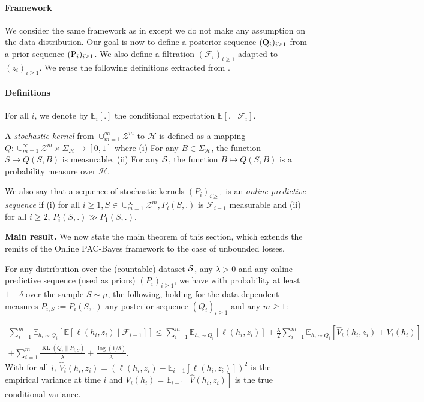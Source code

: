\paragraph{Framework} We consider the same framework as in  except we do not make any assumption on the data distribution. Our goal is now to define a posterior sequence $(\Q_i)_{i\geq 1}$ from a prior sequence $(\P_i)_{i\geq 1}$. We also define a filtration $(\mathcal{F}_{i})_{i\geq 1}$ adapted to $(z_i)_{i\geq 1}$. We reuse the following definitions extracted from \cite{haddouche2022online}.

\paragraph{Definitions} For all $i$, we denote by $\mathbb{E}_{i}[.]$ the conditional expectation $\mathbb{E}[.\mid \mathcal{F}_i]$.

A \emph{stochastic kernel} from $\cup_{m=1}^\infty\mathcal{Z}^m$ to $\mathcal{H}$ is defined as a mapping $Q: \cup_{m=1}^\infty\mathcal{Z}^m\times \Sigma_{\mathcal{H}} \rightarrow [0,1]$ where
(i) For any $B\in \Sigma_{\mathcal{H}}$, the function  $S\mapsto Q(S,B)$ is measurable,  (ii) For any $\S$, the function $B\mapsto Q(S,B)$ is a probability measure over $\mathcal{H}$.


We also say that a sequence of stochastic kernels $(P_i)_{i\geq 1}$ is an \emph{online predictive sequence} if (i) for all $i\geq 1, S\in\cup_{m=1}^\infty\mathcal{Z}^m, P_i(S,.)$ is $\mathcal{F}_{i-1}$ measurable and (ii) for all $i \geq 2$, $P_i(S,.)\gg P_{1}(S,.)$.

\textbf{Main result.} We now state the main theorem of this section, which extends the remits of the Online PAC-Bayes framework to the case of unbounded losses.

\begin{theorem}
  \label{th: main_thm_onl}
  For any distribution over the (countable) dataset $\S$, any $\lambda>0$ and any online predictive sequence (used as priors) $(P_i)_{i\geq 1}$, we have with probability at least $1-\delta$ over the sample $S\sim\mu$, the following, holding for the data-dependent measures $P_{i,S}:= P_i(S,.)$ any posterior sequence $(Q_i)_{i\geq 1}$ and any $m\geq 1$:

  \begin{multline*}
     \sum_{i=1}^m \mathbb{E}_{h_i\sim Q_{i}}\left[ \mathbb{E}[\ell(h_i,z_i) \mid \mathcal{F}_{i-1}]    \right]  \leq \sum_{i=1}^m \mathbb{E}_{h_i\sim Q_{i}}\left[ \ell(h_i,z_i) \right] +\frac{\lambda}{2}\sum_{i=1}^m \mathbb{E}_{h_i\sim Q_i}\left[ \hat{V}_i(h_i,z_i) + V_i(h_i) \right] \\
     + \sum_{i=1}^m\frac{\operatorname{KL}(Q_{i}\| P_{i,S})}{\lambda}  + \frac{\log(1/\delta)}{\lambda}.
  \end{multline*}
  With for all $i$, $\hat{V}_i(h_i,z_i)= (\ell(h_i,z_i)-\mathbb{E}_{i-1}[\ell(h_i,z_i)])^2$ is the empirical variance at time $i$ and $V_i(h_i)= \mathbb{E}_{i-1}[\hat{V}(h_i,z_i)]$ is the true conditional variance.
\end{theorem}

